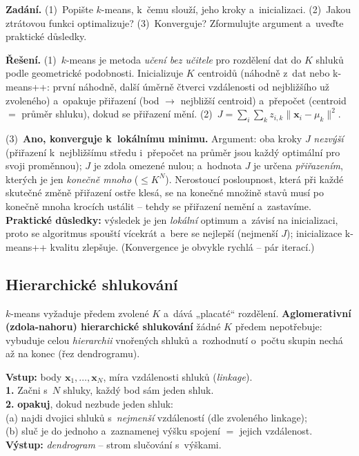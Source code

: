 \begin{priklad}
\par
\textbf{Zadání.} (1)~Popište $k$-means, k~čemu slouží, jeho kroky a~inicializaci. (2)~Jakou ztrátovou funkci optimalizuje? (3)~Konverguje? Zformulujte argument a~uveďte praktické důsledky.

\smallskip
\textbf{Řešení.} (1)~$k$-means je metoda \emph{učení bez učitele} pro rozdělení dat do $K$ shluků podle geometrické podobnosti. Inicializuje $K$ centroidů (náhodně z~dat nebo k-means++: první náhodně, další úměrně čtverci vzdálenosti od nejbližšího už zvoleného) a~opakuje přiřazení (bod $\to$ nejbližší centroid) a~přepočet (centroid $=$ průměr shluku), dokud se přiřazení mění. (2)~$J=\sum_i\sum_k z_{i,k}\|\mathbf{x}_i-\mu_k\|^2$.

(3)~\textbf{Ano, konverguje k~lokálnímu minimu.} Argument: oba kroky $J$ \emph{nezvýší} (přiřazení k~nejbližšímu středu i~přepočet na průměr jsou každý optimální pro svoji proměnnou); $J$ je zdola omezené nulou; a~hodnota $J$ je určena \emph{přiřazením}, kterých je jen \emph{konečně mnoho} ($\le K^N$). Nerostoucí posloupnost, která při každé skutečné změně přiřazení ostře klesá, se na konečné množině stavů musí po konečně mnoha krocích ustálit -- tehdy se přiřazení nemění a~zastavíme. \textbf{Praktické důsledky:} výsledek je jen \emph{lokální} optimum a~závisí na inicializaci, proto se algoritmus spouští vícekrát a~bere se nejlepší (nejmenší $J$); inicializace k-means++ kvalitu zlepšuje. (Konvergence je obvykle rychlá -- pár iterací.)
\end{priklad}

\subsection{Hierarchické shlukování}\label{ssec:hier}

$k$-means vyžaduje předem zvolené $K$ a~dává „placaté`` rozdělení. \textbf{Aglomerativní (zdola-nahoru) hierarchické shlukování} žádné $K$ předem nepotřebuje: vybuduje celou \emph{hierarchii} vnořených shluků a~rozhodnutí o~počtu skupin nechá až na konec (řez dendrogramu).

\begin{algo}
\textbf{Vstup:} body $\mathbf{x}_1,\dots,\mathbf{x}_N$, míra vzdálenosti shluků (\emph{linkage}).\\[2pt]
\textbf{1.} Začni s~$N$ shluky, každý bod sám jeden shluk. \\
\textbf{2.} \textbf{opakuj}, dokud nezbude jeden shluk:\\
\hspace*{1.5em}(a) najdi dvojici shluků s~\emph{nejmenší} vzdáleností (dle zvoleného linkage);\\
\hspace*{1.5em}(b) sluč je do jednoho a~zaznamenej výšku spojení $=$ jejich vzdálenost.\\
\textbf{Výstup:} \emph{dendrogram} -- strom slučování s~výškami.
\end{algo}

